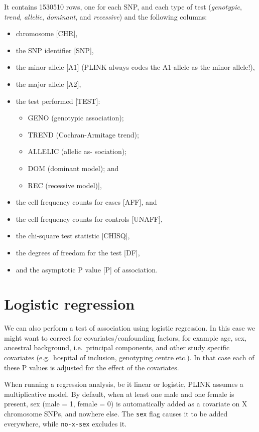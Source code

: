 \documentclass[
]{book}
\providecommand{\tightlist}{%
  \setlength{\itemsep}{0pt}\setlength{\parskip}{0pt}}
\begin{document}
It contains 1530510 rows, one for each SNP, and each type of test (\emph{genotypic}, \emph{trend}, \emph{allelic}, \emph{dominant}, and \emph{recessive}) and the following columns:

\begin{itemize}
\tightlist
\item
  chromosome {[}CHR{]},
\item
  the SNP identifier {[}SNP{]},
\item
  the minor allele {[}A1{]} (PLINK always codes the A1-allele as the minor allele!),
\item
  the major allele {[}A2{]},
\item
  the test performed {[}TEST{]}:

  \begin{itemize}
  \tightlist
  \item
    GENO (genotypic association);
  \item
    TREND (Cochran-Armitage trend);
  \item
    ALLELIC (allelic as- sociation);
  \item
    DOM (dominant model); and
  \item
    REC (recessive model){]},
  \end{itemize}
\item
  the cell frequency counts for cases {[}AFF{]}, and
\item
  the cell frequency counts for controls {[}UNAFF{]},
\item
  the chi-square test statistic {[}CHISQ{]},
\item
  the degrees of freedom for the test {[}DF{]},
\item
  and the asymptotic P value {[}P{]} of association.
\end{itemize}

\hypertarget{logistic-regression}{%
\section{Logistic regression}\label{logistic-regression}}

We can also perform a test of association using logistic regression. In this case we might want to correct for covariates/confounding factors, for example age, sex, ancestral background, i.e.~principal components, and other study specific covariates (e.g.~hospital of inclusion, genotyping centre etc.). In that case each of these P values is adjusted for the effect of the covariates.

When running a regression analysis, be it linear or logistic, PLINK assumes a multiplicative model. By default, when at least one male and one female is present, sex (male = 1, female = 0) is automatically added as a covariate on X chromosome SNPs, and nowhere else. The \texttt{sex} flag causes it to be added everywhere, while \texttt{no-x-sex} excludes it.
\end{document}
